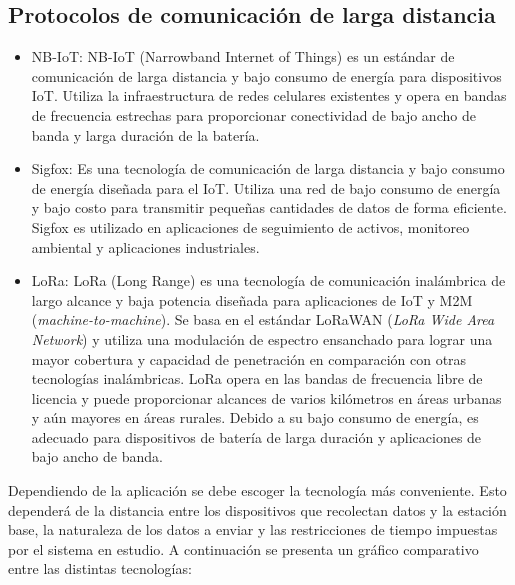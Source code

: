 \subsection{Protocolos de comunicación de larga distancia}

\begin{itemize}

    \item NB-IoT: NB-IoT (Narrowband Internet of Things) es un estándar de comunicación de larga distancia y bajo consumo de energía para dispositivos IoT. Utiliza la infraestructura de redes celulares existentes y opera en bandas de frecuencia estrechas para proporcionar conectividad de bajo ancho de banda y larga duración de la batería.
    \item Sigfox: Es una tecnología de comunicación de larga distancia y bajo consumo de energía diseñada para el IoT. Utiliza una red de bajo consumo de energía y bajo costo para transmitir pequeñas cantidades de datos de forma eficiente. Sigfox es utilizado en aplicaciones de seguimiento de activos, monitoreo ambiental y aplicaciones industriales. 
    \item LoRa: LoRa (Long Range) es una tecnología de comunicación inalámbrica de largo alcance y baja potencia diseñada para aplicaciones de IoT y M2M (\textit{machine-to-machine}). Se basa en el estándar LoRaWAN (\textit{LoRa Wide Area Network}) y utiliza una modulación de espectro ensanchado para lograr una mayor cobertura y capacidad de penetración en comparación con otras tecnologías inalámbricas. LoRa opera en las bandas de frecuencia libre de licencia y puede proporcionar alcances de varios kilómetros en áreas urbanas y aún mayores en áreas rurales. Debido a su bajo consumo de energía, es adecuado para dispositivos de batería de larga duración y aplicaciones de bajo ancho de banda.
\end{itemize}

Dependiendo de la aplicación se debe escoger la tecnología más conveniente. Esto dependerá de la distancia entre los dispositivos que recolectan datos y la estación base, la naturaleza de los datos a enviar y las restricciones de tiempo impuestas por el sistema en estudio. A continuación se presenta un gráfico comparativo entre las distintas tecnologías:

